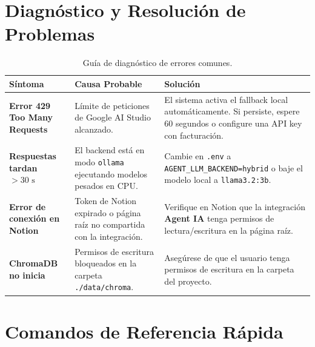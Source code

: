 \documentclass[11pt,a4paper]{article}
\begin{document}
\section{Diagnóstico y Resolución de Problemas}

\begin{table}[!htbp]
\centering
\caption{Guía de diagnóstico de errores comunes.}
\label{tab:troubleshooting}
\begin{tabularx}{\textwidth}{@{}lXX@{}}
\toprule
\textbf{Síntoma} & \textbf{Causa Probable} & \textbf{Solución} \\ \midrule
\textbf{Error 429 Too Many Requests} & Límite de peticiones de Google AI Studio alcanzado. & El sistema activa el fallback local automáticamente. Si persiste, espere 60 segundos o configure una API key con facturación. \\
\textbf{Respuestas tardan $>30\text{ s}$} & El backend está en modo \texttt{ollama} ejecutando modelos pesados en CPU. & Cambie en \texttt{.env} a \texttt{AGENT\_LLM\_BACKEND=hybrid} o baje el modelo local a \texttt{llama3.2:3b}. \\
\textbf{Error de conexión en Notion} & Token de Notion expirado o página raíz no compartida con la integración. & Verifique en Notion que la integración \textbf{Agent IA} tenga permisos de lectura/escritura en la página raíz. \\
\textbf{ChromaDB no inicia} & Permisos de escritura bloqueados en la carpeta \texttt{./data/chroma}. & Asegúrese de que el usuario tenga permisos de escritura en la carpeta del proyecto. \\ \bottomrule
\end{tabularx}
\end{table}

\section{Comandos de Referencia Rápida}
\end{document}
